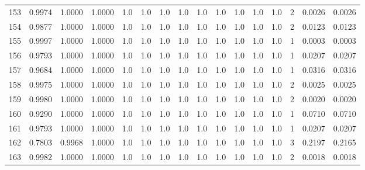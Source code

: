 \begin{tabular}{lrrrrrrrrrrrrrrr}
153 &      0.9974 &  1.0000 &  1.0000 &     1.0 &     1.0 &     1.0 &     1.0 &     1.0 &     1.0 &     1.0 &      1.0 &        1.0 &      2 &                    0.0026 &                     0.0026 \\
154 &      0.9877 &  1.0000 &  1.0000 &     1.0 &     1.0 &     1.0 &     1.0 &     1.0 &     1.0 &     1.0 &      1.0 &        1.0 &      2 &                    0.0123 &                     0.0123 \\
155 &      0.9997 &  1.0000 &  1.0000 &     1.0 &     1.0 &     1.0 &     1.0 &     1.0 &     1.0 &     1.0 &      1.0 &        1.0 &      1 &                    0.0003 &                     0.0003 \\
156 &      0.9793 &  1.0000 &  1.0000 &     1.0 &     1.0 &     1.0 &     1.0 &     1.0 &     1.0 &     1.0 &      1.0 &        1.0 &      1 &                    0.0207 &                     0.0207 \\
157 &      0.9684 &  1.0000 &  1.0000 &     1.0 &     1.0 &     1.0 &     1.0 &     1.0 &     1.0 &     1.0 &      1.0 &        1.0 &      1 &                    0.0316 &                     0.0316 \\
158 &      0.9975 &  1.0000 &  1.0000 &     1.0 &     1.0 &     1.0 &     1.0 &     1.0 &     1.0 &     1.0 &      1.0 &        1.0 &      2 &                    0.0025 &                     0.0025 \\
159 &      0.9980 &  1.0000 &  1.0000 &     1.0 &     1.0 &     1.0 &     1.0 &     1.0 &     1.0 &     1.0 &      1.0 &        1.0 &      2 &                    0.0020 &                     0.0020 \\
160 &      0.9290 &  1.0000 &  1.0000 &     1.0 &     1.0 &     1.0 &     1.0 &     1.0 &     1.0 &     1.0 &      1.0 &        1.0 &      1 &                    0.0710 &                     0.0710 \\
161 &      0.9793 &  1.0000 &  1.0000 &     1.0 &     1.0 &     1.0 &     1.0 &     1.0 &     1.0 &     1.0 &      1.0 &        1.0 &      1 &                    0.0207 &                     0.0207 \\
162 &      0.7803 &  0.9968 &  1.0000 &     1.0 &     1.0 &     1.0 &     1.0 &     1.0 &     1.0 &     1.0 &      1.0 &        1.0 &      3 &                    0.2197 &                     0.2165 \\
163 &      0.9982 &  1.0000 &  1.0000 &     1.0 &     1.0 &     1.0 &     1.0 &     1.0 &     1.0 &     1.0 &      1.0 &        1.0 &      2 &                    0.0018 &                     0.0018 \\

\end{tabular}
